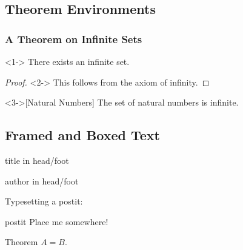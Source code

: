 \documentclass{beamer}
\begin{document}
\subsection{Theorem Environments}
\begin{frame}
  \frametitle{A Theorem on Infinite Sets}
  \begin{theorem}<1->
    There exists an infinite set.
  \end{theorem}
  \begin{proof}<2->
    This follows from the axiom of infinity.
  \end{proof}
  \begin{example}<3->[Natural Numbers]
    The set of natural numbers is infinite.
  \end{example}
\end{frame}
\subsection{Framed and Boxed Text}
\begin{frame}
  \begin{beamercolorbox}[ht=2.5ex,dp=1ex,center]{title in head/foot}
      \insertshorttitle
  \end{beamercolorbox}%
  \begin{beamercolorbox}[ht=2.5ex,dp=1ex,center]{author in head/foot}
      \insertshortauthor
  \end{beamercolorbox}
  \mbox{}\medskip\newline
  Typesetting a postit:\newline
  \begin{beamercolorbox}[sep=1em,wd=5cm]{postit}
      Place me somewhere!
  \end{beamercolorbox}
  \mbox{}\medskip\newline
  \begin{beamerboxesrounded}[upper=block head,lower=block body,shadow=true]{Theorem}
      $A = B$.
  \end{beamerboxesrounded}
\end{frame}
\end{document}
